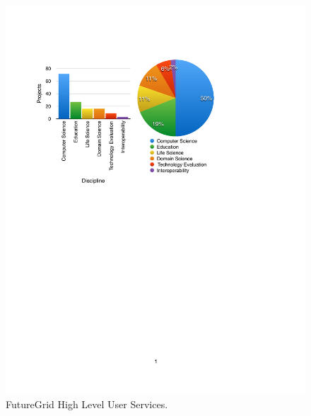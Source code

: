 \begin{figure}[htb]
  \centering
    \includegraphics[width=1.0\textwidth]{images/project-disciplines.pdf}
  \caption{FutureGrid High Level User Services.}
\end{figure}

